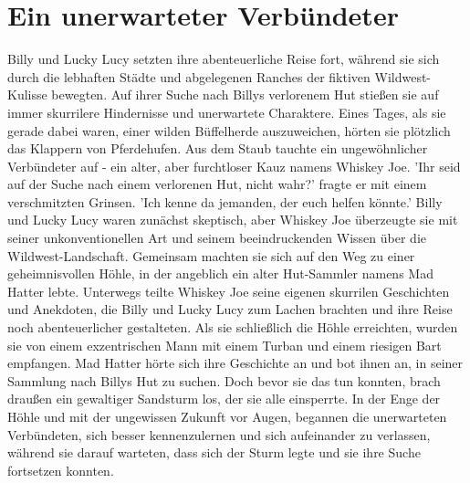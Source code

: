 \documentclass[12pt]{article} %
\begin{document}
\section{ Ein unerwarteter Verbündeter }
\begin{minipage}{\textwidth}
    Billy und Lucky Lucy setzten ihre abenteuerliche Reise fort, während sie sich durch die lebhaften Städte und abgelegenen Ranches der fiktiven Wildwest-Kulisse bewegten. Auf ihrer Suche nach Billys verlorenem Hut stießen sie auf immer skurrilere Hindernisse und unerwartete Charaktere. Eines Tages, als sie gerade dabei waren, einer wilden Büffelherde auszuweichen, hörten sie plötzlich das Klappern von Pferdehufen. Aus dem Staub tauchte ein ungewöhnlicher Verbündeter auf - ein alter, aber furchtloser Kauz namens Whiskey Joe. 'Ihr seid auf der Suche nach einem verlorenen Hut, nicht wahr?' fragte er mit einem verschmitzten Grinsen. 'Ich kenne da jemanden, der euch helfen könnte.' Billy und Lucky Lucy waren zunächst skeptisch, aber Whiskey Joe überzeugte sie mit seiner unkonventionellen Art und seinem beeindruckenden Wissen über die Wildwest-Landschaft. Gemeinsam machten sie sich auf den Weg zu einer geheimnisvollen Höhle, in der angeblich ein alter Hut-Sammler namens Mad Hatter lebte. Unterwegs teilte Whiskey Joe seine eigenen skurrilen Geschichten und Anekdoten, die Billy und Lucky Lucy zum Lachen brachten und ihre Reise noch abenteuerlicher gestalteten. Als sie schließlich die Höhle erreichten, wurden sie von einem exzentrischen Mann mit einem Turban und einem riesigen Bart empfangen. Mad Hatter hörte sich ihre Geschichte an und bot ihnen an, in seiner Sammlung nach Billys Hut zu suchen. Doch bevor sie das tun konnten, brach draußen ein gewaltiger Sandsturm los, der sie alle einsperrte. In der Enge der Höhle und mit der ungewissen Zukunft vor Augen, begannen die unerwarteten Verbündeten, sich besser kennenzulernen und sich aufeinander zu verlassen, während sie darauf warteten, dass sich der Sturm legte und sie ihre Suche fortsetzen konnten.
\end{minipage}
\end{document}
